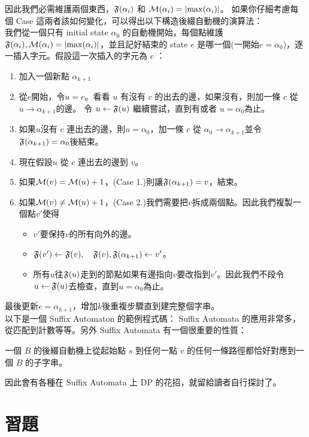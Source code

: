 \documentclass[a4paper,12pt]{book}
\begin{document}
因此我們必需維護兩個東西，$\operatorname{\mathfrak{F}}(\alpha_i)$ 和 $\operatorname{\mathcal{M}}(\alpha_i) = \lvert \max(\alpha_i) \rvert$。
如果你仔細考慮每個 Case 這兩者該如何變化，可以得出以下構造後綴自動機的演算法：\\
我們從一個只有 initial state $\alpha_0$ 的自動機開始，每個點維護$\operatorname{\mathfrak{F}}(\alpha_i), \operatorname{\mathcal{M}}(\alpha_i) = \lvert \max(\alpha_i) \rvert$，並且記好結束的 state $e$ 是哪一個(一開始$e = \alpha_0$)，逐一插入字元。假設這一次插入的字元為 $c$ ：
\begin{enumerate}
  \item 加入一個新點 $\alpha_{k+1}$
  \item 從$e$開始，令$u = e$。看看 $u$ 有沒有 $c$ 的出去的邊，如果沒有，則加一條 $c$ 從 $u \rightarrow \alpha_{k+1}$的邊。 令 $u \leftarrow \operatorname{\mathfrak{F}}(u)$ 繼續嘗試，直到有或者 $u = \alpha_0$為止。
  \item 如果$u$沒有 $c$ 連出去的邊，則$u = \alpha_0$，加一條 $c$ 從 $\alpha_0 \rightarrow \alpha_{k+1}$並令$\operatorname{\mathfrak{F}}(\alpha_{k+1}) = \alpha_0$後結束。
  \item  現在假設$u$ 從 $c$ 連出去的邊到 $v$。
  \item 如果$\operatorname{\mathcal{M}}(v) = \operatorname{\mathcal{M}}(u) + 1$，(Case 1.)則讓$\operatorname{\mathfrak{F}}(\alpha_{k+1}) = v$，結束。
  \item 如果$\operatorname{\mathcal{M}}(v) \neq \operatorname{\mathcal{M}}(u) + 1$，(Case 2.)我們需要把$v$拆成兩個點。因此我們複製一個點$v'$使得
    \begin{itemize}
      \item $v'$要保持$v$的所有向外的邊。
      \item $\operatorname{\mathfrak{F}}(v') \leftarrow \operatorname{\mathfrak{F}}(v), \quad \operatorname{\mathfrak{F}}(v), \operatorname{\mathfrak{F}}(\alpha_{k+1}) \leftarrow v'$。
      \item 所有$u$往$\operatorname{\mathfrak{F}}(u)$走到的節點如果有邊指向$v$要改指到$v'$。因此我們不段令$u \leftarrow \operatorname{\mathfrak{F}}(u)$去檢查，直到$u = \alpha_0$為止。
    \end{itemize}
\end{enumerate}
最後更新$e = \alpha_{k+1}$，增加$k$後重複步驟直到建完整個字串。\\
以下是一個 Suffix Automaton 的範例程式碼：
Suffix Automata 的應用非常多，從匹配到計數等等。另外 Suffix Automata 有一個很重要的性質：
\begin{theorem}[定理]
  一個 $B$ 的後綴自動機上從起始點 $s$ 到任何一點 $v$ 的任何一條路徑都恰好對應到一個 $B$ 的子字串。
\end{theorem}
因此會有各種在 Suffix Automata 上 DP 的花招，就留給讀者自行探討了。

\section{習題}
\end{document}
